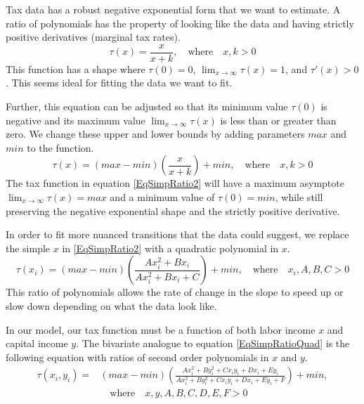 \documentclass[letterpaper,12pt]{article}
\theoremstyle{definition}
\begin{document}
    Tax data has a robust negative exponential form that we want to estimate. A ratio of polynomials has the property of looking like the data and having strictly positive derivatives (marginal tax rates).
    \begin{equation}\label{EqSimpRatio}
      \tau(x) = \frac{x}{x+k}, \quad\text{where}\quad x,k>0
    \end{equation}
    This function has a shape where $\tau(0) = 0$, $\lim_{x\rightarrow\infty}\tau(x) = 1$, and $\tau'(x) > 0$. This seems ideal for fitting the data we want to fit.

    Further, this equation can be adjusted so that its minimum value $\tau(0)$ is negative and its maximum value $\lim_{x\rightarrow\infty}\tau(x)$ is less than or greater than zero. We change these upper and lower bounds by adding parameters $max$ and $min$ to the function.
    \begin{equation}\label{EqSimpRatio2}
      \tau(x) = (max - min)\left(\frac{x}{x+k}\right) + min, \quad\text{where}\quad x,k>0
    \end{equation}
    The tax function in equation \eqref{EqSimpRatio2} will have a maximum asymptote $\lim_{x\rightarrow\infty}\tau(x) = max$ and a minimum value of $\tau(0) = min$, while still preserving the negative exponential shape and the strictly positive derivative.

    In order to fit more nuanced transitions that the data could suggest, we replace the simple $x$ in \eqref{EqSimpRatio2} with a quadratic polynomial in $x$.
    \begin{equation}\label{EqSimpRatioQuad}
      \tau(x_i) = (max - min)\left(\frac{Ax_i^2 + Bx_i}{Ax_i^2 + Bx_i + C}\right) + min, \quad\text{where}\quad x_i,A,B,C>0
    \end{equation}
    This ratio of polynomials allows the rate of change in the slope to speed up or slow down depending on what the data look like.

    In our model, our tax function must be a function of both labor income $x$ and capital income $y$. The bivariate analogue to equation \ref{EqSimpRatioQuad} is the following equation with ratios of second order polynomials in $x$ and $y$.
    \begin{equation}\label{EqBivRatioQuad}
      \begin{split}
        \tau(x_i,y_i) = &(max - min)\left(\frac{Ax_i^2 + By_i^2 + Cx_iy_i + Dx_i + Ey_i}{Ax_i^2 + By_i^2 + Cx_iy_i + Dx_i + Ey_i + F}\right) + min, \\
        &\quad\text{where}\quad x,y,A,B,C,D,E,F>0
      \end{split}
    \end{equation}
\end{document}
